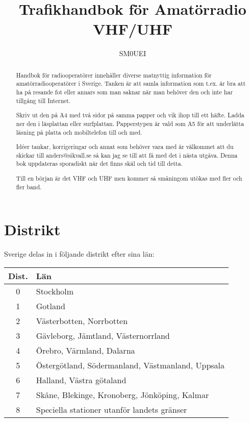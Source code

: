 \documentclass[10pt,swedish,a4paper]{article}
\begin{document}
\title{Trafikhandbok för Amatörradio\\
VHF/UHF}
\author{SM0UEI}
\maketitle

\begin{abstract}
Handbok för radiooperatörer innehåller diverse matnyttig information för amatörradiooperatörer i Sverige. Tanken är att samla information som t.ex. är bra att ha på resande fot eller annars som man saknar när man behöver den och inte har tillgång till Internet.

Skriv ut den på A4 med två sidor på samma papper och vik ihop till ett häfte. Ladda ner den i läsplattan eller surfplattan. Papperstypen är vald som A5 för att underlätta läsning på platta och mobiltelefon till och med.

Idéer tankar, korrigeringar och annat som behöver vara med är väl\-kom\-met att du skickar till anders@sikvall.se så kan jag se till att få med det i nästa utgåva. Denna bok uppdateras sporadiskt när det finns skäl och tid till detta.

Till en början är det VHF och UHF men kommer så småningom utökas med fler och fler band.
\end{abstract}

\clearpage
\tableofcontents
\clearpage

\setlength{\parskip}{0.5em}
\setlength{\parindent}{0pt}


\section{Distrikt}

Sverige delas in i följande distrikt efter sina län:

\begin{tabular}{cl}
	\textbf{Dist.} & \textbf{Län}                                     \\ \hline
	      0        & Stockholm                                        \\
	      1        & Gotland                                          \\
	      2        & Västerbotten, Norrbotten                         \\
	      3        & Gävleborg, Jämtland, Västernorrland              \\
	      4        & Örebro, Värmland, Dalarna                        \\
	      5        & Östergötland, Södermanland, Västmanland, Uppsala \\
	      6        & Halland, Västra götaland                         \\
	      7        & Skåne, Blekinge, Kronoberg, Jönköping, Kalmar    \\
	      8        & Speciella stationer utanför landets gränser
\end{tabular}
\end{document}
